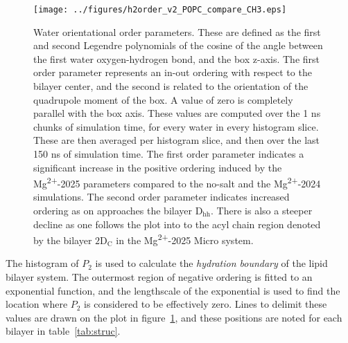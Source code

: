 \documentclass[12pt,openany,final]{book}
\newcommand{\dhh}{$\text{D}_\text{hh}$}
\newcommand{\dc}{$\text{2D}_\text{C}$}
\newcommand{\mg}{Mg\textsuperscript{2+}}
\begin{document}
\begin{figure}[H]
    \caption[Water orientational ordering]{Water orientational order parameters. These are defined as the first and second Legendre polynomials of the cosine of the angle between the first water oxygen-hydrogen bond, and the box z-axis. The first
    order parameter represents an in-out ordering with respect to the bilayer center, and the second is related to the orientation of the quadrupole moment of the box. A value of zero is completely
    parallel with the box axis. These values are computed over the 1 ns chunks of simulation time, for every water in every histogram slice. These are then averaged per histogram slice, and then over the last 150 ns of simulation time. {\color{blue} The first order parameter indicates a significant increase in the positive ordering induced by the \mg{-2025} parameters compared to the no-salt and the
        \mg{-2024} simulations.  The second order parameter indicates increased ordering as on approaches the bilayer \dhh{}. There is also a steeper decline as one follows the plot into to the acyl chain region denoted by the bilayer \dc{} in the
\mg{-2025} Micro system.}}
    \label{fig:h2order}
    \texttt{[image: ../figures/h2order\_v2\_POPC\_compare\_CH3.eps]}
\end{figure}
The histogram of $P_2$ is used to calculate the \emph{hydration boundary} of the lipid bilayer system. The outermost
region of negative ordering is fitted to an exponential function, and the lengthscale of the exponential is used to find the location where $P_2$ is considered to be effectively zero.
Lines to delimit these values are drawn on the plot in figure~\ref{fig:h2order}, and these positions are noted for each bilayer
in table~\ref{tab:struc}.
\end{document}
